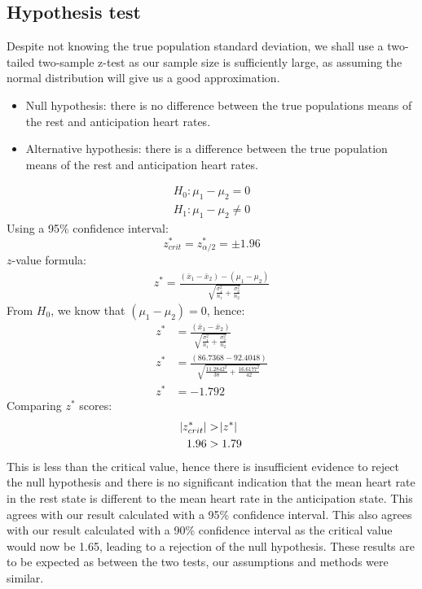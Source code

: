 \documentclass[11pt]{article}
\numberwithin{equation}{section}
\begin{document}
\subsection{Hypothesis test}
Despite not knowing the true population standard deviation, we shall use a two-tailed two-sample z-test as our sample size is sufficiently large, as assuming the normal distribution will give us a good approximation. 
\begin{itemize}
    \item Null hypothesis: there is no difference between the true populations means of the rest and anticipation heart rates.
    \item Alternative hypothesis: there is a difference between the true population means of the rest and anticipation heart rates.
\end{itemize}
\begin{gather}
    H_0: \mu_1 - \mu_2 = 0\\
    H_1: \mu_1 - \mu_2 \neq 0
\end{gather}
Using a 95\% confidence interval:
\begin{equation}
    z^*_{crit} = z^*_{\alpha/2} = \pm 1.96
\end{equation}
$z$-value formula:
\begin{gather}
    z^* = \frac{\left(\bar{x}_1 - \bar{x}_2\right) - \left(\mu_1 - \mu_2\right)}{\sqrt{\frac{\sigma_1^2}{n_1} + \frac{\sigma_2^2}{n_2}}}
\end{gather}
From $H_0$, we know that $\left(\mu_1 - \mu_2\right) = 0$, hence:
\begin{align}
    z^* &= \frac{\left(\bar{x}_1 - \bar{x}_2\right)}{\sqrt{\frac{\sigma_1^2}{n_1} + \frac{\sigma_2^2}{n_2}}}\\
    z^* &= \frac{\left(86.7368 - 92.4048\right)}{\sqrt{\frac{11.2842^2}{38} + \frac{16.6177^2}{42}}}\\
    z^* &= -1.792
\end{align}
Comparing $z^*$ scores:
\begin{align}
    \abs{z^*_{crit}} &> \abs{z^*}\\
    1.96 &> 1.79
\end{align}
This is less than the critical value, hence there is insufficient evidence to reject the null hypothesis and there is no significant indication that the mean heart rate in the rest state is different to the mean heart rate in the anticipation state. This agrees with our result calculated with a 95\% confidence interval. This also agrees with our result calculated with a 90\% confidence interval as the critical value would now be 1.65, leading to a rejection of the null hypothesis. These results are to be expected as between the two tests, our assumptions and methods were similar. 
\end{document}
